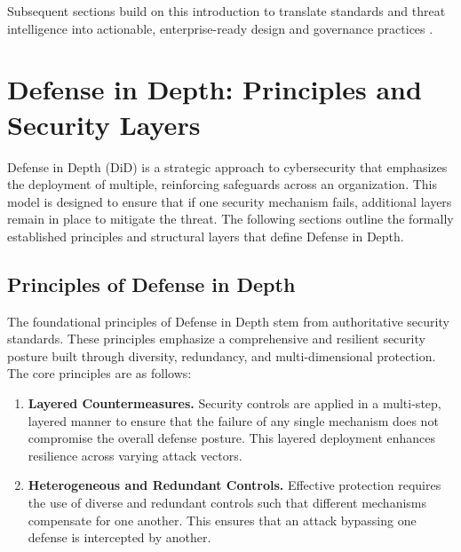 \begin{TNtwocol}
      Subsequent sections build on this introduction to translate standards and threat intelligence into actionable, enterprise-ready design and governance practices \cite{NIST_AI_RMF_100_1, NIST_GenAI_Profile_600_1, ISO_23894_2023, NIST_SP800_207, CISA_ZTMM_v2, OWASP_LLM_Top10, MITRE_ATLAS, CIS_Controls_v8_1, CIS_Cloud_Companion_v8_1}.


      \section{Defense in Depth: Principles and Security Layers}

      \medskip

      Defense in Depth (DiD) is a strategic approach to cybersecurity that emphasizes the deployment of multiple, reinforcing safeguards across an organization. This model is designed to ensure that if one security mechanism fails, additional layers remain in place to mitigate the threat. The following sections outline the formally established principles and structural layers that define Defense in Depth.

      \subsection{Principles of Defense in Depth}

      \medskip

      The foundational principles of Defense in Depth stem from authoritative security standards. These principles emphasize a comprehensive and resilient security posture built through diversity, redundancy, and multi-dimensional protection. The core principles are as follows:

      \begin{enumerate}
            \item \textbf{Layered Countermeasures.}
                  Security controls are applied in a multi-step, layered manner to ensure that the failure of any single mechanism does not compromise the overall defense posture. This layered deployment enhances resilience across varying attack vectors.\cite{NIST_SP800_12R1}

                  \smallskip

            \item \textbf{Heterogeneous and Redundant Controls.}
                  Effective protection requires the use of diverse and redundant controls such that different mechanisms compensate for one another. This ensures that an attack bypassing one defense is intercepted by another.\cite{NSA_IATF_3_1}


\end{enumerate}
\end{TNtwocol}
